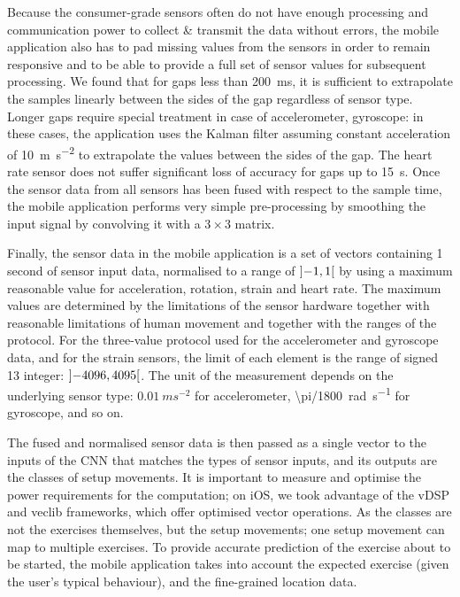 \documentclass[a4paper, 10 pt, conference]{IEEEtran}
\begin{document}
Because the consumer-grade sensors often do not have enough processing and communication power to collect \& transmit the data without errors, the mobile application also has to pad missing values from the sensors in order to remain responsive and to be able to provide a full set of sensor values for subsequent processing. We found that for gaps less than \SI{200}{\milli\second}, it is sufficient to extrapolate the samples linearly between the sides of the gap regardless of sensor type. Longer gaps require special treatment in case of accelerometer, gyroscope: in these cases, the application uses the Kalman filter assuming constant acceleration of \SI{10}{\meter\second^{-2}} to extrapolate the values between the sides of the gap. The heart rate sensor does not suffer significant loss of accuracy for gaps up to \SI{15}{\second}. Once the sensor data from all sensors has been fused with respect to the sample time, the mobile application performs very simple pre-processing by smoothing the input signal by convolving it with a $3 \times 3$ matrix.

Finally, the sensor data in the mobile application is a set of vectors containing 1 second of sensor input data, normalised to a range of $\interval[open]{-1}{1}$ by using a maximum reasonable value for acceleration, rotation, strain and heart rate. The maximum values are determined by the limitations of the sensor hardware together with reasonable limitations of human movement and together with the ranges of the protocol. For the three-value protocol used for the accelerometer and gyroscope data, and for the strain sensors, the limit of each element is the range of signed \SI{13}{\bit} integer: $\interval[open]{-4096}{4095}$. The unit of the measurement depends on the underlying sensor type: $0.01\ ms^{-2}$ for accelerometer, \SI{\pi/1800}{\radian\per\second} for gyroscope, and so on.

The fused and normalised sensor data is then passed as a single vector to the inputs of the CNN that matches the types of sensor inputs, and its outputs are the classes of setup movements. It is important to measure and optimise the power requirements for the computation; on iOS, we took advantage of the vDSP and veclib frameworks, which offer optimised vector operations. As the classes are not the exercises themselves, but the setup movements; one setup movement can map to multiple exercises. To provide accurate prediction of the exercise about to be started, the mobile application takes into account the expected exercise (given the user's typical behaviour), and the fine-grained location data. 
\end{document}
